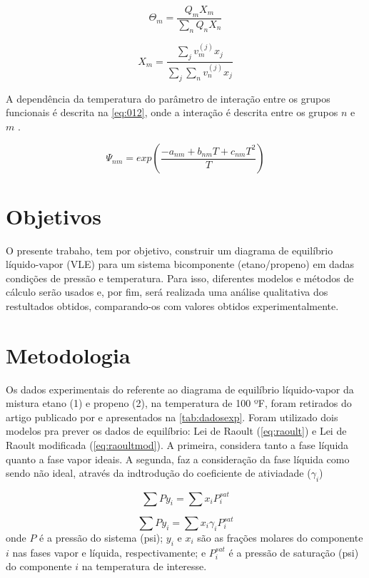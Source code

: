 \begin{equation}\label{eq:010}
\Theta_m = \frac{Q_mX_m}{\displaystyle\sum_nQ_nX_n}
\end{equation}

\begin{equation}\label{eq:011}
X_m =
\frac{\displaystyle\sum_jv^{(j)}_mx_j}{\displaystyle\sum_j\sum_nv_n^{(j)}x_j}
\end{equation}

A dependência da temperatura do parâmetro de interação entre os grupos
funcionais é descrita na \autoref{eq:012}, onde a interação é descrita entre os
grupos $n$ e $m$ .

\begin{equation}\label{eq:012}
\Psi_{nm} = exp \left ( \frac{-a_{nm} + b_{nm}T + c_{nm}T^2}{T} \right)
\end{equation}
\section{Objetivos}

O presente trabaho, tem por objetivo, construir um diagrama de equilíbrio
líquido-vapor (VLE) para um sistema bicomponente (etano/propeno) em dadas
condições de pressão e temperatura. Para isso, diferentes modelos e
métodos de cálculo serão usados e, por fim, será realizada uma análise
qualitativa dos restultados obtidos, comparando-os com valores obtidos experimentalmente.


\section{Metodologia}

Os dados experimentais do referente ao diagrama de equilíbrio líquido-vapor da
mistura etano (1) e propeno (2), na temperatura de 100 ºF, foram retirados do
artigo publicado por  e apresentados na \autoref{tab:dadosexp}. Foram
utilizado dois modelos pra prever os dados de equilíbrio: Lei de Raoult (\autoref{eq:raoult}) e Lei de
Raoult modificada (\autoref{eq:raoultmod}). A primeira, considera tanto a fase
líquida quanto a fase vapor ideais. A segunda, faz a consideração da fase
líquida como sendo não ideal, através da indtrodução do coeficiente de
ativiadade ($\gamma_i$)

\begin{equation}\label{eq:raoult}
\sum Py_i = \sum x_iP_i^{sat}
\end{equation}

\begin{equation}\label{eq:raoultmod}
\sum Py_i = \sum x_i\gamma_iP_i^{sat}
\end{equation}
onde $P$ é a pressão do sistema (psi); $y_i$ e $x_i$ são as frações molares do
componente $i$ nas fases vapor e líquida, respectivamente; e $P_i^{sat}$ é a pressão de
saturação (psi) do componente $i$ na temperatura de interesse.

